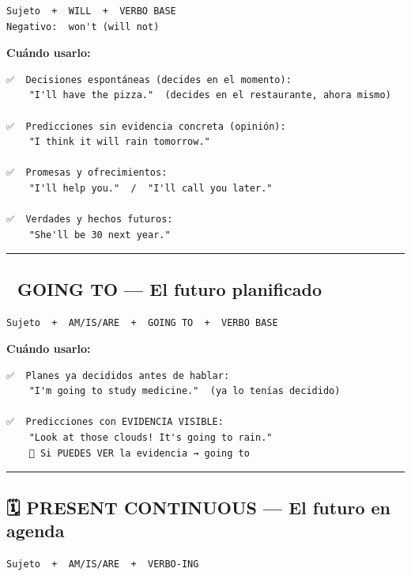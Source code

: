 \documentclass[
  spanish,
  letterpaper,
]{scrbook}
\begin{document}
\begin{verbatim}
Sujeto  +  WILL  +  VERBO BASE
Negativo:  won't (will not)
\end{verbatim}

\textbf{Cuándo usarlo:}

\begin{verbatim}
✅  Decisiones espontáneas (decides en el momento):
    "I'll have the pizza."  (decides en el restaurante, ahora mismo)

✅  Predicciones sin evidencia concreta (opinión):
    "I think it will rain tomorrow."

✅  Promesas y ofrecimientos:
    "I'll help you."  /  "I'll call you later."

✅  Verdades y hechos futuros:
    "She'll be 30 next year."
\end{verbatim}

\begin{center}\rule{0.5\linewidth}{0.5pt}\end{center}

\subsection{📅 GOING TO --- El futuro
planificado}\label{going-to-el-futuro-planificado}

\begin{verbatim}
Sujeto  +  AM/IS/ARE  +  GOING TO  +  VERBO BASE
\end{verbatim}

\textbf{Cuándo usarlo:}

\begin{verbatim}
✅  Planes ya decididos antes de hablar:
    "I'm going to study medicine."  (ya lo tenías decidido)

✅  Predicciones con EVIDENCIA VISIBLE:
    "Look at those clouds! It's going to rain."
    🧠 Si PUEDES VER la evidencia → going to
\end{verbatim}

\begin{center}\rule{0.5\linewidth}{0.5pt}\end{center}

\subsection{🗓️ PRESENT CONTINUOUS --- El futuro en
agenda}\label{present-continuous-el-futuro-en-agenda}

\begin{verbatim}
Sujeto  +  AM/IS/ARE  +  VERBO-ING
\end{verbatim}
\end{document}
